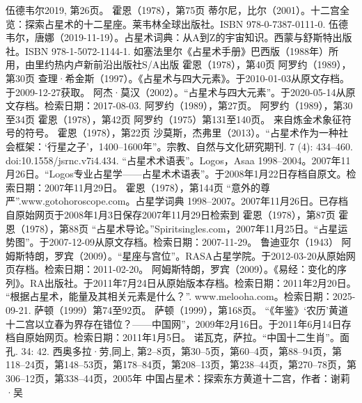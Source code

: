  伍德韦尔2019, 第26页。
 霍恩（1978），第75页
 蒂尔尼，比尔（2001）。十二宫全览：探索占星术的十二星座。莱韦林全球出版社。ISBN 978-0-7387-0111-0.
 伍德韦尔，唐娜（2019-11-19）。占星术词典：从A到Z的宇宙知识。西蒙与舒斯特出版社。ISBN 978-1-5072-1144-1.
 如塞法里尔《占星术手册》巴西版（1988年）所用，由里约热内卢新前沿出版社S/A出版
 霍恩（1978），第40页
 阿罗约（1989），第30页
 查理·希金斯（1997）。《占星术与四大元素》。于2010-01-03从原文存档。于2009-12-27获取。
 阿杰·莫汉（2002）。“占星术与四大元素”。于2020-05-14从原文存档。检索日期：2017-08-03.
 阿罗约（1989），第27页。
 阿罗约（1989），第30至34页
 霍恩（1978），第42页
 阿罗约（1975）第131至140页。
 来自炼金术象征符号的符号。
 霍恩（1978），第22页
 沙莫斯，杰弗里（2013）。“占星术作为一种社会框架：‘行星之子’，1400–1600年”。宗教、自然与文化研究期刊. 7 (4): 434–460. doi:10.1558/jsrnc.v7i4.434.
 “占星术术语表”。Logos，Asaa 1998–2004。2007年11月26日。“Logos专业占星学——占星术术语表”。于2008年1月22日存档自原文。检索日期：2007年11月29日。
 霍恩（1978），第144页
 “意外的尊严”.www.gotohoroscope.com。占星学词典 1998–2007。2007年11月26日。已存档自原始网页于2008年1月3日保存2007年11月29日检索到
 霍恩（1978），第87页
 霍恩（1978），第88页
 “占星术导论。”Spiritsingles.com，2007年11月25日。“占星运势图”。于2007-12-09从原文存档。检索日期：2007-11-29。
 鲁迪亚尔（1943）
 阿姆斯特朗，罗宾（2009）。“星座与宫位”。RASA占星学院。于2012-03-20从原始网页存档。检索日期：2011-02-20。
 阿姆斯特朗，罗宾（2009）。《易经：变化的序列》。RA出版社。于2011年7月24日从原始版本存档。检索日期：2011年2月20日。
 “根据占星术，能量及其相关元素是什么？”. www.melooha.com。检索日期：2025-09-21.
 萨顿（1999）第74至92页。
 萨顿（1999），第168页。
 “《年鉴》‘农历’黄道十二宫以立春为界存在错位？——中国网”，2009年2月16日。于2011年6月14日存档自原始网页。检索日期：2011年1月5日。
 诺瓦克，萨拉。“中国十二生肖”。面孔. 34: 42.
 西奥多拉·劳,同上, 第2–8页，第30–5页，第60–4页，第88–94页，第118–24页，第148–53页，第178–84页，第208–13页，第238–44页，第270–78页，第306–12页，第338–44页，2005年
 中国占星术：探索东方黄道十二宫，作者：谢莉·吴